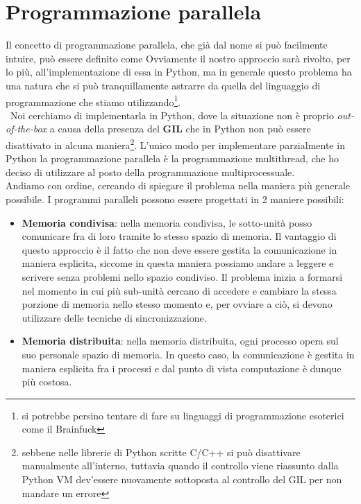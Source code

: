 \documentclass{report}
\begin{document}
\chapter{Programmazione parallela}
Il concetto di programmazione parallela, che già dal nome si può facilmente intuire, può essere definito come 
\noindent Ovviamente il nostro approccio sarà rivolto, per lo più, all'implementazione di essa in Python, ma in generale questo problema ha una natura che si può tranquillamente astrarre da quella del linguaggio di programmazione che stiamo utilizzando\footnote{si potrebbe persino tentare di fare su linguaggi di programmazione esoterici come il Brainfuck}.\\\ Noi cerchiamo di implementarla in Python, dove la situazione non è proprio \emph{out-of-the-box} a causa della presenza del \textbf{GIL} che in Python non può essere disattivato in alcuna maniera\footnote{sebbene nelle librerie di Python scritte C/C++ si può disattivare manualmente all'interno, tuttavia quando il controllo viene riassunto dalla Python VM dev'essere nuovamente sottoposta al controllo del GIL per non mandare un errore}. L'unico modo per implementare parzialmente in Python la programmazione parallela è la programmazione multithread, che ho deciso di utilizzare al posto della programmazione multiprocessuale. \\
Andiamo con ordine, cercando di spiegare il problema nella maniera più generale possibile. I programmi paralleli possono essere progettati in 2 maniere possibili:

\begin{itemize}
	\item \textbf{Memoria condivisa}: nella memoria condivisa, le sotto-unità posso comunicare fra di loro tramite lo stesso spazio di memoria. Il vantaggio di questo approccio è il fatto che non deve essere gestita la comunicazione in maniera esplicita, siccome in questa maniera possiamo andare a leggere e scrivere senza problemi nello spazio condiviso. Il problema inizia a formarsi nel momento in cui più sub-unità cercano di accedere e cambiare la stessa porzione di memoria nello stesso momento e, per ovviare a ciò, si devono utilizzare delle tecniche di sincronizzazione.
	\item \textbf{Memoria distribuita}: nella memoria distribuita, ogni processo opera sul suo personale spazio di memoria. In questo caso, la comunicazione è gestita in maniera esplicita fra i processi e dal punto di vista computazione è dunque più costosa.
\end{itemize}
\end{document}
